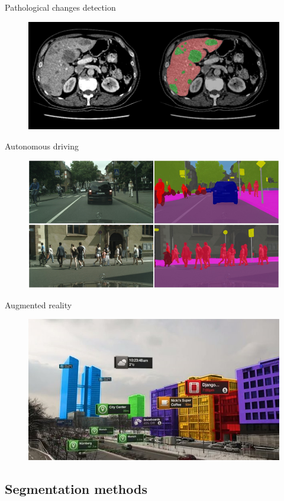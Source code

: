 \documentclass[12]{beamer}
\begin{document}
\begin{frame}{Pathological changes detection}

\begin{figure}
\includegraphics[width=\textwidth]{applications_medicine}
\end{figure}

\end{frame}

\begin{frame}{Autonomous driving}

\begin{figure}
\includegraphics[width=\textwidth]{applications_driving}
\end{figure}

\end{frame}

\begin{frame}{Augmented reality}

\begin{figure}
\includegraphics[width=\textwidth]{applications_vr}
\end{figure}

\end{frame}

\subsection{Segmentation methods}
\end{document}
